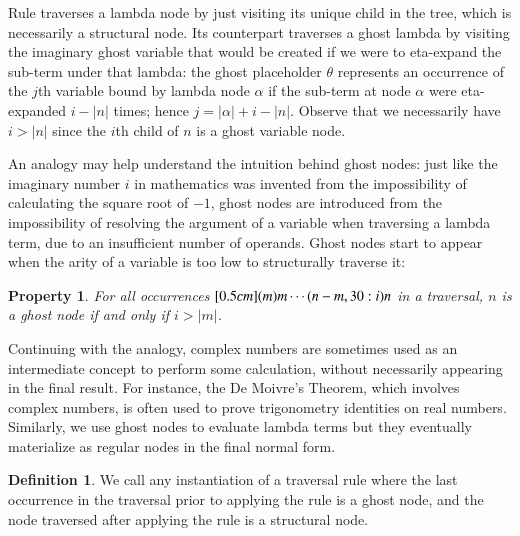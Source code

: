 \documentclass{elsarticle}
\theoremstyle{plain}
\newtheorem{property}[theorem]{Property}
\theoremstyle{definition}
\newtheorem{definition}{Definition}[section]
\theoremstyle{remark}
\newcommand{\ghostvar}{\theta}
\begin{document}
Rule  traverses a lambda node by just visiting its unique child  in the tree, which is necessarily a structural node. Its counterpart \rulenamet{Lam^\ghostvar} traverses a ghost lambda by visiting the imaginary ghost variable that would be created if we were to eta-expand the sub-term under that lambda: the ghost placeholder $\ghostvar$ represents an occurrence of the $j$th variable bound by lambda node $\alpha$ if the sub-term at node $\alpha$ were eta-expanded $i-|n|$ times; hence $j = |\alpha| + i - |n|$.
Observe that we necessarily have $i>|n|$ since the $i$th child of $n$ is a ghost variable node.

An analogy may help understand the intuition behind ghost nodes:
just like the imaginary number $i$ in mathematics was invented from the impossibility of calculating the square root of $-1$, ghost nodes are introduced from the impossibility of resolving the argument of a variable when traversing a lambda term, due to an insufficient number of operands. Ghost nodes start to appear when the arity of a variable is too low to structurally traverse it:
\begin{property}
\label{prop:ghost_justifier_arity}
For all occurrences $\Pstr[0.5cm]{(m){m} \cdots (n-m,30:i){n}}$ in a traversal, $n$ is a ghost node if and only if $i > |m|$.
\end{property}


Continuing with the analogy, complex numbers are sometimes used as an intermediate concept to perform some calculation, without necessarily appearing in the final result. For instance, the De Moivre's Theorem, which involves complex numbers, is often used to prove trigonometry identities on real numbers. Similarly, we use ghost nodes to evaluate lambda terms but they eventually materialize as regular nodes in the final normal form.

\begin{definition}
We call  any instantiation of a traversal rule where the last occurrence in the traversal prior to applying the rule is a ghost node, and the node traversed after applying the rule is a structural node.
\end{definition}
\end{document}
